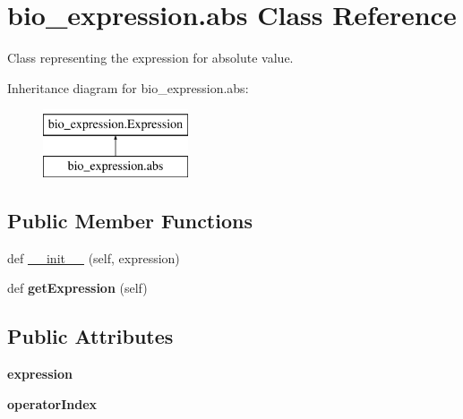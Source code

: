 \hypertarget{classbio__expression_1_1abs}{}\section{bio\+\_\+expression.\+abs Class Reference}
\label{classbio__expression_1_1abs}


Class representing the expression for absolute value.  


Inheritance diagram for bio\+\_\+expression.\+abs\+:\begin{figure}[H]
\begin{center}
\leavevmode
\includegraphics[height=2.000000cm]{classbio__expression_1_1abs}
\end{center}
\end{figure}
\subsection*{Public Member Functions}
\begin{DoxyCompactItemize}
\item 
def \hyperlink{classbio__expression_1_1abs_ab1102a84a8e7bdf8c76e0ad0e408d599}{\+\_\+\+\_\+init\+\_\+\+\_\+} (self, expression)
\item 
def {\bfseries get\+Expression} (self)\hypertarget{classbio__expression_1_1abs_a63ed91a4a7e04bf1e34429db72b6af16}{}\label{classbio__expression_1_1abs_a63ed91a4a7e04bf1e34429db72b6af16}

\end{DoxyCompactItemize}
\subsection*{Public Attributes}
\begin{DoxyCompactItemize}
\item 
{\bfseries expression}\hypertarget{classbio__expression_1_1abs_af74ad5264822b73581b7ead7fbe46768}{}\label{classbio__expression_1_1abs_af74ad5264822b73581b7ead7fbe46768}

\item 
{\bfseries operator\+Index}\hypertarget{classbio__expression_1_1abs_a865d909c93911c8d51db150d4aa9e727}{}\label{classbio__expression_1_1abs_a865d909c93911c8d51db150d4aa9e727}

\end{DoxyCompactItemize}


